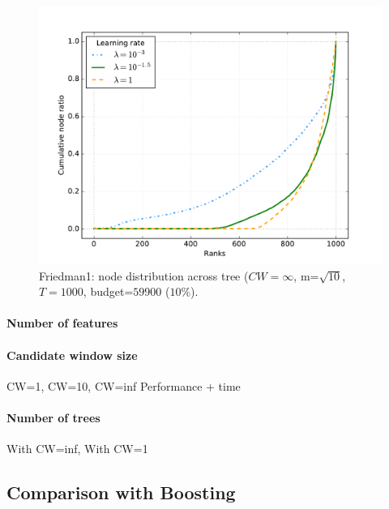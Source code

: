 \documentclass{article}
\begin{document}
\begin{figure}[ht]
\begin{center}
\centerline{\includegraphics[width=\columnwidth]{friedman1_cumul}}
\caption{Friedman1: node distribution across tree ($CW=\infty$, 
m=$\sqrt{10}$, $T=1000$, budget=$59900$ ($10\%$).}
\label{fig:LRShape}
\end{center}
\vskip -0.2in
\end{figure} 

\paragraph{Number of features}

\paragraph{Candidate window size}
CW=1, CW=10, CW=inf
Performance + time

\paragraph{Number of trees}
With CW=inf, With CW=1

\subsection{Comparison with Boosting}

\end{document}
